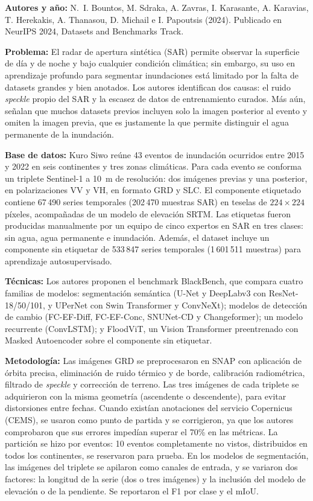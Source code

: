 \documentclass[conference]{IEEEtran}
\begin{document}
\textbf{Autores y año:} N.~I. Bountos, M. Sdraka, A. Zavras, I. Karasante, A. Karavias, T. Herekakis, A. Thanasou, D. Michail e I. Papoutsis (2024). Publicado en NeurIPS 2024, Datasets and Benchmarks Track.

\textbf{Problema:} El radar de apertura sintética (SAR) permite observar la superficie de día y de noche y bajo cualquier condición climática; sin embargo, su uso en aprendizaje profundo para segmentar inundaciones está limitado por la falta de datasets grandes y bien anotados. Los autores identifican dos causas: el ruido \textit{speckle} propio del SAR y la escasez de datos de entrenamiento curados. Más aún, señalan que muchos datasets previos incluyen solo la imagen posterior al evento y omiten la imagen previa, que es justamente la que permite distinguir el agua permanente de la inundación.

\textbf{Base de datos:} Kuro Siwo reúne 43 eventos de inundación ocurridos entre 2015 y 2022 en seis continentes y tres zonas climáticas. Para cada evento se conforma un triplete Sentinel-1 a 10~m de resolución: dos imágenes previas y una posterior, en polarizaciones VV y VH, en formato GRD y SLC. El componente etiquetado contiene 67\,490 series temporales (202\,470 muestras SAR) en teselas de $224\times224$ píxeles, acompañadas de un modelo de elevación SRTM. Las etiquetas fueron producidas manualmente por un equipo de cinco expertos en SAR en tres clases: sin agua, agua permanente e inundación. Además, el dataset incluye un componente sin etiquetar de 533\,847 series temporales (1\,601\,511 muestras) para aprendizaje autosupervisado.

\textbf{Técnicas:} Los autores proponen el benchmark BlackBench, que compara cuatro familias de modelos: segmentación semántica (U-Net y DeepLabv3 con ResNet-18/50/101, y UPerNet con Swin Transformer y ConvNeXt); modelos de detección de cambio (FC-EF-Diff, FC-EF-Conc, SNUNet-CD y Changeformer); un modelo recurrente (ConvLSTM); y FloodViT, un Vision Transformer preentrenado con Masked Autoencoder sobre el componente sin etiquetar.

\textbf{Metodología:} Las imágenes GRD se preprocesaron en SNAP con aplicación de órbita precisa, eliminación de ruido térmico y de borde, calibración radiométrica, filtrado de \textit{speckle} y corrección de terreno. Las tres imágenes de cada triplete se adquirieron con la misma geometría (ascendente o descendente), para evitar distorsiones entre fechas. Cuando existían anotaciones del servicio Copernicus (CEMS), se usaron como punto de partida y se corrigieron, ya que los autores comprobaron que sus errores impedían superar el 70\% en las métricas. La partición se hizo por eventos: 10 eventos completamente no vistos, distribuidos en todos los continentes, se reservaron para prueba. En los modelos de segmentación, las imágenes del triplete se apilaron como canales de entrada, y se variaron dos factores: la longitud de la serie (dos o tres imágenes) y la inclusión del modelo de elevación o de la pendiente. Se reportaron el F1 por clase y el mIoU.
\end{document}
